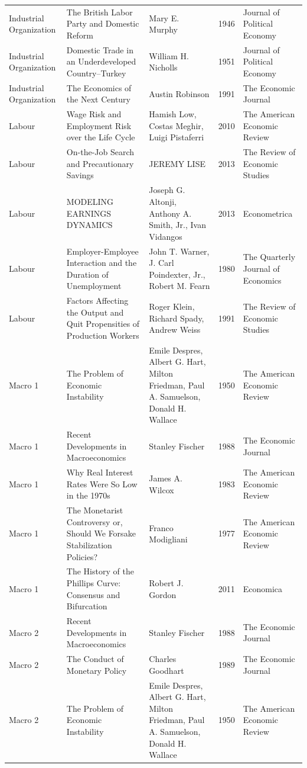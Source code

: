\begin{xltabular}[p]{\hsize}{sYsrs}
Industrial Organization & The British Labor Party and Domestic Reform & Mary E. Murphy & 1946 & Journal of Political Economy \\
Industrial Organization & Domestic Trade in an Underdeveloped Country--Turkey & William H. Nicholls & 1951 & Journal of Political Economy \\
Industrial Organization & The Economics of the Next Century & Austin Robinson & 1991 & The Economic Journal \\
Labour & Wage Risk and Employment Risk over the Life Cycle & Hamish Low, Costas Meghir, Luigi Pistaferri & 2010 & The American Economic Review \\
Labour & On-the-Job Search and Precautionary Savings & JEREMY LISE & 2013 & The Review of Economic Studies \\
Labour & MODELING EARNINGS DYNAMICS & Joseph G. Altonji, Anthony A. Smith, Jr., Ivan Vidangos & 2013 & Econometrica \\
Labour & Employer-Employee Interaction and the Duration of Unemployment & John T. Warner, J. Carl Poindexter, Jr., Robert M. Fearn & 1980 & The Quarterly Journal of Economics \\
Labour & Factors Affecting the Output and Quit Propensities of Production Workers & Roger Klein, Richard Spady, Andrew Weiss & 1991 & The Review of Economic Studies \\
Macro 1 & The Problem of Economic Instability & Emile Despres, Albert G. Hart, Milton Friedman, Paul A. Samuelson, Donald H. Wallace & 1950 & The American Economic Review \\
Macro 1 & Recent Developments in Macroeconomics & Stanley Fischer & 1988 & The Economic Journal \\
Macro 1 & Why Real Interest Rates Were So Low in the 1970s & James A. Wilcox & 1983 & The American Economic Review \\
Macro 1 & The Monetarist Controversy or, Should We Forsake Stabilization Policies? & Franco Modigliani & 1977 & The American Economic Review \\
Macro 1 & The History of the Phillips Curve: Consensus and Bifurcation & Robert J. Gordon & 2011 & Economica \\
Macro 2 & Recent Developments in Macroeconomics & Stanley Fischer & 1988 & The Economic Journal \\
Macro 2 & The Conduct of Monetary Policy & Charles Goodhart & 1989 & The Economic Journal \\
Macro 2 & The Problem of Economic Instability & Emile Despres, Albert G. Hart, Milton Friedman, Paul A. Samuelson, Donald H. Wallace & 1950 & The American Economic Review \\

\end{xltabular}
